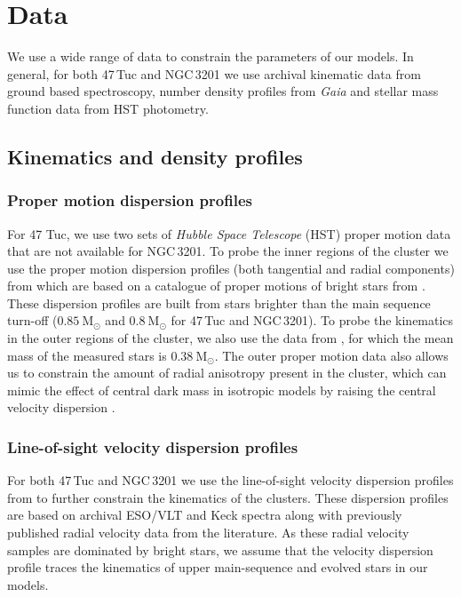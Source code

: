 \newcommand{\evolvemf}{\code{evolve\_mf}}



\section{Data}


We use a wide range of data to constrain the parameters of our models. In general, for both 47\,Tuc
and NGC\,3201 we use archival kinematic data from ground based spectroscopy, number density profiles from
\emph{Gaia} and stellar mass function data from HST photometry.

\subsection{Kinematics and density profiles}

\subsubsection{Proper motion dispersion profiles}

For 47 Tuc, we use two sets of {\it Hubble Space Telescope} (HST) proper motion data that are not
available for NGC\,3201. To probe the inner regions of the cluster we use the proper motion
dispersion profiles (both tangential and radial components) from \citet{Watkins2015} which are based
on a catalogue of proper motions of bright stars from \citet{Bellini2014}. These dispersion profiles
are built from stars brighter than the main sequence turn-off ($0.85 \ \mathrm{M}_\odot$ and $0.8 \
	\mathrm{M}_\odot$ for 47\,Tuc and NGC\,3201). To probe the kinematics in the outer regions of the
cluster, we also use the data from \citet{Heyl2017}, for which the mean mass of the measured stars
is $0.38 \ \mathrm{M}_{\odot}$. The outer proper motion data also allows us to constrain the amount
of radial anisotropy present in the cluster, which can mimic the effect of central dark mass in
isotropic models by raising the central velocity dispersion \citep{Zocchi2017}.


\subsubsection{Line-of-sight velocity dispersion profiles}

For both 47\,Tuc and NGC\,3201 we use the line-of-sight velocity dispersion profiles from
\citet{Baumgardt2018} to further constrain the kinematics of the clusters. These dispersion profiles
are based on archival ESO/VLT and Keck spectra along with previously published radial velocity data
from the literature. As these radial velocity samples are dominated by bright stars, we assume that
the velocity dispersion profile traces the kinematics of upper main-sequence and evolved stars in
our models.

